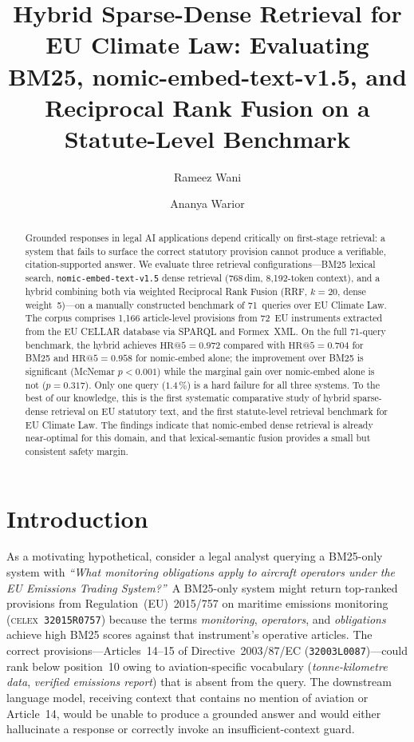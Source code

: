 \documentclass[sigconf,screen]{acmart}
\title{Hybrid Sparse-Dense Retrieval for EU Climate Law:
  Evaluating BM25, nomic-embed-text-v1.5, and Reciprocal Rank Fusion
  on a Statute-Level Benchmark}
\author{Rameez Wani}
\affiliation{%
  \institution{School of Computing, Dublin City University}
  \city{Dublin}
  \country{Ireland}
}
\author{Ananya Warior}
\affiliation{%
  \institution{School of Computing, Dublin City University}
  \city{Dublin}
  \country{Ireland}
}
\makeatletter
\newcommand{\HR}[1]{\mathrm{HR}@{#1}}
\newcommand{\nomic}{\texttt{nomic-embed-text-v1.5}\xspace}
\newcommand{\nomicshort}{nomic-embed\xspace}
\newcommand{\rrf}{RRF\xspace}
\makeatother
\begin{document}
\begin{abstract}
Grounded responses in legal AI applications depend critically on
first-stage retrieval: a system that fails to surface the correct
statutory provision cannot produce a verifiable, citation-supported
answer.  We evaluate three retrieval configurations---BM25 lexical
search, \nomic dense retrieval (768\,dim, 8{,}192-token context), and
a hybrid combining both via weighted Reciprocal Rank Fusion (\rrf,
$k{=}20$, dense weight~5)---on a manually constructed benchmark of
71~queries over EU Climate Law.  The corpus comprises 1{,}166
article-level provisions from 72~EU instruments extracted from the EU
CELLAR database via SPARQL and Formex~XML.  On the full 71-query
benchmark, the hybrid achieves $\HR{5}{=}0.972$ compared with
$\HR{5}{=}0.704$ for BM25 and $\HR{5}{=}0.958$ for \nomicshort alone;
the improvement over BM25 is significant (McNemar $p{<}0.001$) while
the marginal gain over \nomicshort alone is not ($p{=}0.317$).  Only
one query ($1.4\,\%$) is a hard failure for all three systems.  To the
best of our knowledge, this is the first systematic comparative study
of hybrid sparse-dense retrieval on EU statutory text, and the first
statute-level retrieval benchmark for EU Climate Law.  The findings
indicate that \nomicshort dense retrieval is already near-optimal for
this domain, and that lexical-semantic fusion provides a small but
consistent safety margin.
\end{abstract}

\maketitle

\section{Introduction}
\label{sec:intro}

As a motivating hypothetical, consider a legal analyst querying a
BM25-only system with \textit{``What monitoring obligations apply to
aircraft operators under the EU Emissions Trading System?''}\ A
BM25-only system might return top-ranked provisions from
Regulation~(EU)~2015/757 on maritime emissions monitoring
(\textsc{celex}~\texttt{32015R0757}) because the terms
\textit{monitoring}, \textit{operators}, and \textit{obligations}
achieve high BM25 scores against that instrument's operative
articles.  The correct provisions---Articles~14--15 of
Directive~2003/87/EC (\texttt{32003L0087})---could rank below
position~10 owing to aviation-specific vocabulary
(\textit{tonne-kilometre data}, \textit{verified emissions report})
that is absent from the query.  The downstream language model,
receiving context that contains no mention of aviation or
Article~14, would be unable to produce a grounded answer and would
either hallucinate a response or correctly invoke an
insufficient-context guard.
\end{document}
